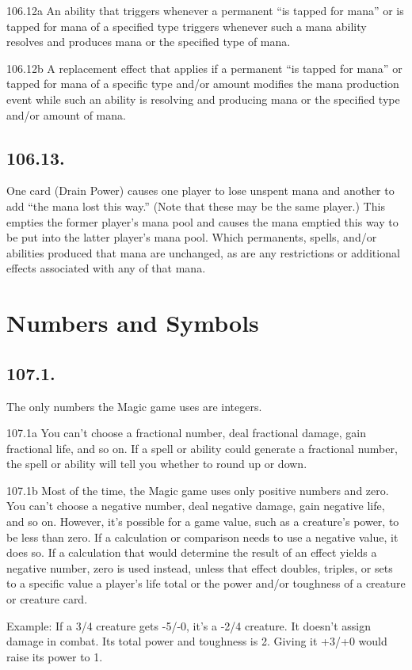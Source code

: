 106.12a An ability that triggers whenever a permanent “is tapped for mana” or is tapped for mana of a specified type triggers whenever such a mana ability resolves and produces mana or the specified type of mana.

106.12b A replacement effect that applies if a permanent “is tapped for mana” or tapped for mana of a specific type and/or amount modifies the mana production event while such an ability is resolving and producing mana or the specified type and/or amount of mana.

\subsection*{106.13.}
One card (Drain Power) causes one player to lose unspent mana and another to add “the mana lost this way.” (Note that these may be the same player.) This empties the former player’s mana pool and causes the mana emptied this way to be put into the latter player’s mana pool. Which permanents, spells, and/or abilities produced that mana are unchanged, as are any restrictions or additional effects associated with any of that mana.

\section{Numbers and Symbols}
\subsection*{107.1.}
The only numbers the Magic game uses are integers.

107.1a You can’t choose a fractional number, deal fractional damage, gain fractional life, and so on. If a spell or ability could generate a fractional number, the spell or ability will tell you whether to round up or down.

107.1b Most of the time, the Magic game uses only positive numbers and zero. You can’t choose a negative number, deal negative damage, gain negative life, and so on. However, it’s possible for a game value, such as a creature’s power, to be less than zero. If a calculation or comparison needs to use a negative value, it does so. If a calculation that would determine the result of an effect yields a negative number, zero is used instead, unless that effect doubles, triples, or sets to a specific value a player’s life total or the power and/or toughness of a creature or creature card.

Example: If a 3/4 creature gets -5/-0, it’s a -2/4 creature. It doesn’t assign damage in combat. Its total power and toughness is 2. Giving it +3/+0 would raise its power to 1.

